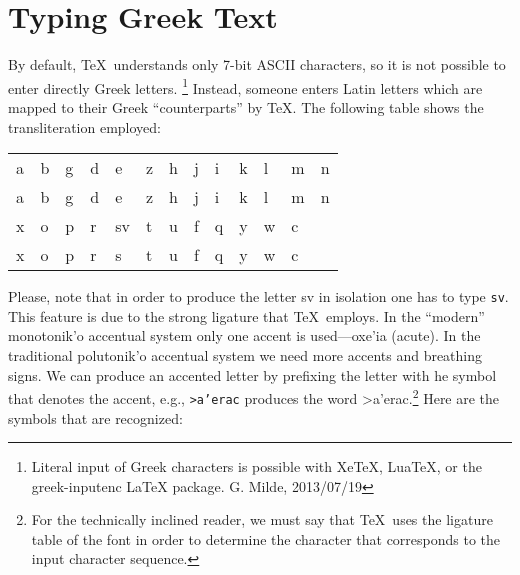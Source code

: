 \documentclass[11pt]{article}
\newcommand{\langGreek}{\foreignlanguage{greek}}
\newcommand{\sg}{\selectlanguage{greek}}
\newcommand{\sa}{\selectlanguage{american}}
\begin{document}
\section{Typing Greek Text}
By default, \TeX\ understands only 7-bit ASCII characters, so it is not
possible to enter directly Greek letters.%
\footnote{Literal input of Greek characters
is possible with XeTeX, LuaTeX, or the greek-inputenc LaTeX package.
G. Milde, 2013/07/19}
Instead, someone enters Latin letters
which are mapped to their Greek ``counterparts'' by \TeX. The following
table shows the transliteration employed:
\begin{center}
\begin{tabular}{|lllllllllllll|}\hline
\langGreek{a}&
\langGreek{b}&
\langGreek{g}&
\langGreek{d}&
\langGreek{e}&
\langGreek{z}&
\langGreek{h}&
\langGreek{j}&
\langGreek{i}&
\langGreek{k}&
\langGreek{l}&
\langGreek{m}&
\langGreek{n}\\
a& b& g& d&  e&  z&  h&  j&  i&  k&  l&  m&  n\\
\hline
\langGreek{x}&
\langGreek{o}&
\langGreek{p}&
\langGreek{r}&
\langGreek{sv}&
\langGreek{t}&
\langGreek{u}&
\langGreek{f}&
\langGreek{q}&
\langGreek{y}&
\langGreek{w}&
\langGreek{c}& \hbox{ } \\
x&  o&  p&  r&  s&
t&  u&  f&  q&  y&  w& c& \hbox{ }\\ \hline
\end{tabular}
\end{center}
Please, note that in order to produce the letter \langGreek{sv} in isolation
one has to type \texttt{sv}. This feature is due to the strong ligature
that \TeX\ employs.
In the ``modern'' \langGreek{monotonik'o} accentual system only one accent is
used---\langGreek{oxe'ia} (acute). In the traditional \langGreek{polutonik'o}
accentual system we
need more accents and breathing signs. We can produce an accented letter by
prefixing the letter with he symbol that denotes the accent, e.g.,
\texttt{>a'erac} produces the word \sg >a'erac.\sa\footnote{For the
technically inclined reader, we must say that \TeX\ uses the ligature table of
the font in order to determine the character that corresponds to the
input character sequence.} Here are the symbols that are recognized:
\end{document}
